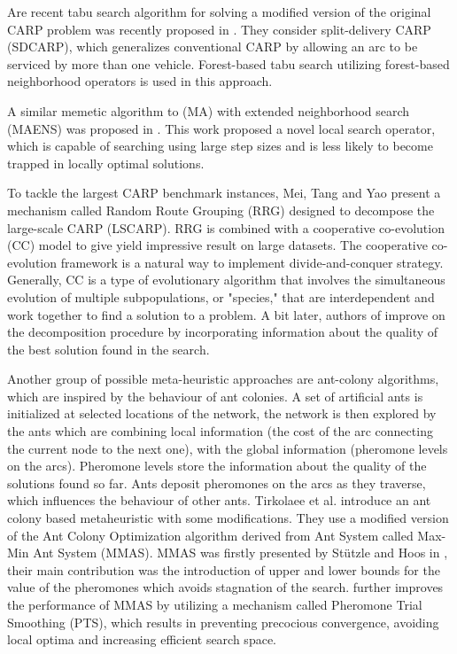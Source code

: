 \documentclass[oneside]{ctuthesis}
\theoremstyle{plain}
\theoremstyle{definition}
\theoremstyle{note}
\begin{document}
Are recent tabu search algorithm for solving a modified version of the original CARP problem was recently proposed in \cite{lai2018forest}. They consider split-delivery CARP (SDCARP), which generalizes conventional CARP by allowing an arc to be serviced by more than one vehicle. Forest-based tabu search utilizing forest-based neighborhood operators is used in this approach.

A similar memetic algorithm to (MA) with extended neighborhood search (MAENS) was proposed in \cite{tang2009memetic}. This work proposed a novel local search operator, which is capable of searching using large step sizes and is less likely to become trapped in locally optimal solutions.

To tackle the largest CARP benchmark instances, Mei, Tang and Yao \cite{mei2013decomposing} present a mechanism called Random Route Grouping (RRG) designed to decompose the large-scale CARP (LSCARP). RRG is combined with a cooperative co-evolution (CC) model to give yield impressive result on large datasets. The cooperative co-evolution framework is a natural way to implement divide-and-conquer strategy. Generally, CC is a type of evolutionary algorithm that involves the simultaneous evolution of multiple subpopulations, or "species," that are interdependent and work together to find a solution to a problem. A bit later, authors of \cite{mei2014variable} improve on the decomposition procedure by incorporating information about the quality of the best solution found in the search.

Another group of possible meta-heuristic approaches are ant-colony algorithms, which are inspired by the behaviour of ant colonies. A set of artificial ants is initialized at selected locations of the network, the network is then explored by the ants which are combining local information (the cost of the arc connecting the current node to the next one), with the global information (pheromone levels on the arcs). Pheromone levels store the information about the quality of the solutions found so far. Ants deposit pheromones on the arcs as they traverse, which influences the behaviour of other ants. 
Tirkolaee et al. \cite{TIRKOLAEE2019457} introduce an ant colony based metaheuristic with some modifications. They use a modified version of the Ant Colony Optimization algorithm derived from Ant System called Max-Min Ant System (MMAS). MMAS was firstly presented by Stützle and Hoos in \cite{stutzle2000max}, their main contribution was the introduction of upper and lower bounds for the value of the pheromones which avoids stagnation of the search. \cite{TIRKOLAEE2019457} further improves the performance of MMAS by utilizing a mechanism called Pheromone Trial Smoothing (PTS), which results in preventing precocious convergence, avoiding local optima and increasing efficient search space.
\end{document}
